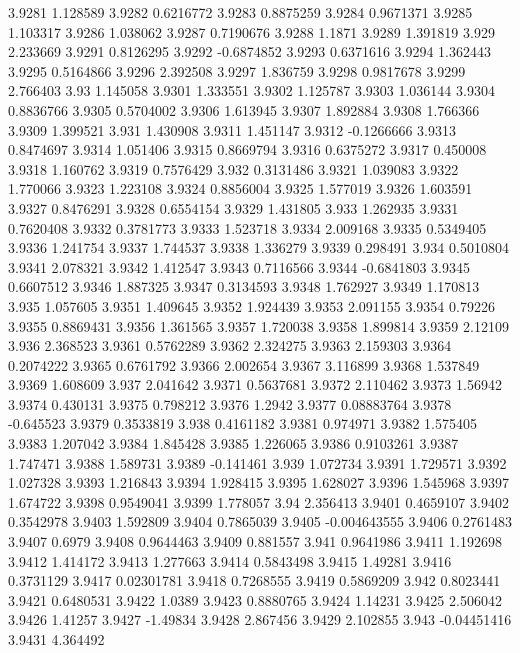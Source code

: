3.9281  1.128589
3.9282  0.6216772
3.9283  0.8875259
3.9284  0.9671371
3.9285  1.103317
3.9286  1.038062
3.9287  0.7190676
3.9288  1.1871
3.9289  1.391819
3.929  2.233669
3.9291  0.8126295
3.9292  -0.6874852
3.9293  0.6371616
3.9294  1.362443
3.9295  0.5164866
3.9296  2.392508
3.9297  1.836759
3.9298  0.9817678
3.9299  2.766403
3.93  1.145058
3.9301  1.333551
3.9302  1.125787
3.9303  1.036144
3.9304  0.8836766
3.9305  0.5704002
3.9306  1.613945
3.9307  1.892884
3.9308  1.766366
3.9309  1.399521
3.931  1.430908
3.9311  1.451147
3.9312  -0.1266666
3.9313  0.8474697
3.9314  1.051406
3.9315  0.8669794
3.9316  0.6375272
3.9317  0.450008
3.9318  1.160762
3.9319  0.7576429
3.932  0.3131486
3.9321  1.039083
3.9322  1.770066
3.9323  1.223108
3.9324  0.8856004
3.9325  1.577019
3.9326  1.603591
3.9327  0.8476291
3.9328  0.6554154
3.9329  1.431805
3.933  1.262935
3.9331  0.7620408
3.9332  0.3781773
3.9333  1.523718
3.9334  2.009168
3.9335  0.5349405
3.9336  1.241754
3.9337  1.744537
3.9338  1.336279
3.9339  0.298491
3.934  0.5010804
3.9341  2.078321
3.9342  1.412547
3.9343  0.7116566
3.9344  -0.6841803
3.9345  0.6607512
3.9346  1.887325
3.9347  0.3134593
3.9348  1.762927
3.9349  1.170813
3.935  1.057605
3.9351  1.409645
3.9352  1.924439
3.9353  2.091155
3.9354  0.79226
3.9355  0.8869431
3.9356  1.361565
3.9357  1.720038
3.9358  1.899814
3.9359  2.12109
3.936  2.368523
3.9361  0.5762289
3.9362  2.324275
3.9363  2.159303
3.9364  0.2074222
3.9365  0.6761792
3.9366  2.002654
3.9367  3.116899
3.9368  1.537849
3.9369  1.608609
3.937  2.041642
3.9371  0.5637681
3.9372  2.110462
3.9373  1.56942
3.9374  0.430131
3.9375  0.798212
3.9376  1.2942
3.9377  0.08883764
3.9378  -0.645523
3.9379  0.3533819
3.938  0.4161182
3.9381  0.974971
3.9382  1.575405
3.9383  1.207042
3.9384  1.845428
3.9385  1.226065
3.9386  0.9103261
3.9387  1.747471
3.9388  1.589731
3.9389  -0.141461
3.939  1.072734
3.9391  1.729571
3.9392  1.027328
3.9393  1.216843
3.9394  1.928415
3.9395  1.628027
3.9396  1.545968
3.9397  1.674722
3.9398  0.9549041
3.9399  1.778057
3.94  2.356413
3.9401  0.4659107
3.9402  0.3542978
3.9403  1.592809
3.9404  0.7865039
3.9405  -0.004643555
3.9406  0.2761483
3.9407  0.6979
3.9408  0.9644463
3.9409  0.881557
3.941  0.9641986
3.9411  1.192698
3.9412  1.414172
3.9413  1.277663
3.9414  0.5843498
3.9415  1.49281
3.9416  0.3731129
3.9417  0.02301781
3.9418  0.7268555
3.9419  0.5869209
3.942  0.8023441
3.9421  0.6480531
3.9422  1.0389
3.9423  0.8880765
3.9424  1.14231
3.9425  2.506042
3.9426  1.41257
3.9427  -1.49834
3.9428  2.867456
3.9429  2.102855
3.943  -0.04451416
3.9431  4.364492
